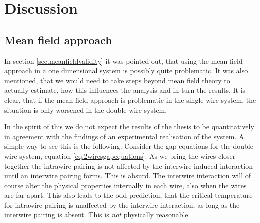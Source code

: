 \chapter{Discussion} %

\label{Chapter12} %

\section{Mean field approach} \label{sec.Discussion.meanfieldapproach}
In section \ref{sec.meanfieldvalidity} it was pointed out, that using the mean field approach in a one dimensional system is possibly quite problematic. It was also mentioned, that we would need to take steps beyond mean field theory to actually estimate, how this influences the analysis and in turn the results. It is clear, that if the mean field approach is problematic in the single wire system, the situation is only worsened in the double wire system. 

In the spirit of this we do not expect the results of the thesis to be quantitatively in agreement with the findings of an experimental realisation of the system. A simple way to see this is the following. Consider the gap equations for the double wire system, equation \eqref{eq.2wiresgapequations}. As we bring the wires closer together the intrawire pairing is not affected by the interwire induced interaction until an interwire pairing forms. This is absurd. The interwire interaction will of course alter the physical properties internally in each wire, also when the wires are far apart. This also leads to the odd prediction, that the critical temperature for intrawire pairing is unaffected by the interwire interaction, as long as the interwire pairing is absent. This is \textit{not} physically reasonable. 

